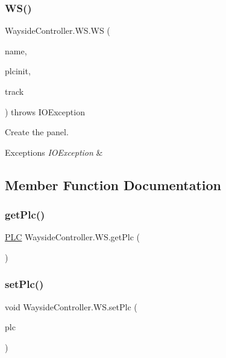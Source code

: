 \subsubsection{\texorpdfstring{W\+S()}{WS()}}
{\footnotesize\ttfamily Wayside\+Controller.\+W\+S.\+WS (\begin{DoxyParamCaption}\item[{String}]{name,  }\item[{\hyperlink{classWaysideController_1_1PLC}{P\+LC}}]{plcinit,  }\item[{\hyperlink{classTrackModel_1_1TrackModel}{Track\+Model}}]{track }\end{DoxyParamCaption}) throws I\+O\+Exception}



Create the panel. 


\begin{DoxyExceptions}{Exceptions}
{\em I\+O\+Exception} & \\
\hline
\end{DoxyExceptions}


\subsection{Member Function Documentation}
\mbox{\label{classWaysideController_1_1WS_a9672eb8c7582f4a60d37bba5427c547d}} 
\subsubsection{\texorpdfstring{get\+Plc()}{getPlc()}}
{\footnotesize\ttfamily \hyperlink{classWaysideController_1_1PLC}{P\+LC} Wayside\+Controller.\+W\+S.\+get\+Plc (\begin{DoxyParamCaption}{ }\end{DoxyParamCaption})}

\mbox{\label{classWaysideController_1_1WS_a51de417826432d895ca6f32295311f37}} 
\subsubsection{\texorpdfstring{set\+Plc()}{setPlc()}}
{\footnotesize\ttfamily void Wayside\+Controller.\+W\+S.\+set\+Plc (\begin{DoxyParamCaption}\item[{\hyperlink{classWaysideController_1_1PLC}{P\+LC}}]{plc }\end{DoxyParamCaption})}



